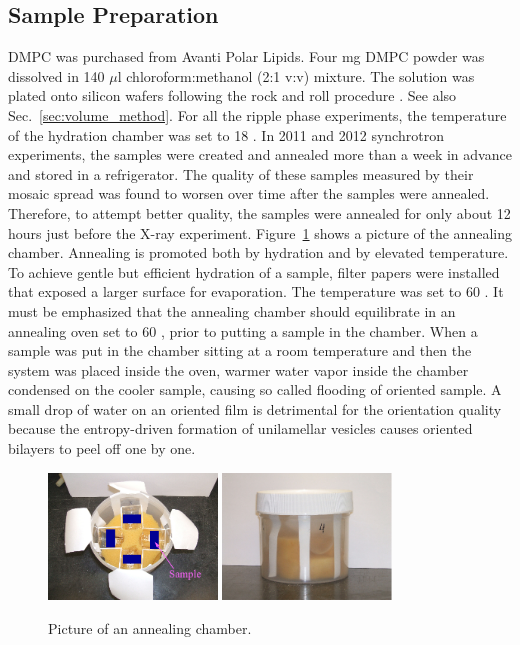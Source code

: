 \subsection{Sample Preparation}
DMPC was purchased from Avanti Polar Lipids.
Four mg DMPC powder was dissolved in 140 $\mu$l chloroform:methanol (2:1 v:v) 
mixture. The solution was plated onto silicon wafers following the rock and
roll procedure \cite{Tristram-Nagle07_MMB}. 
See also Sec.~\ref{sec:volume_method}.
For all the ripple phase experiments, the temperature of the hydration 
chamber was set to 18 \textcelsius. 
In 2011 and 2012 synchrotron experiments, the samples were created and annealed 
more than a week in advance and stored in a refrigerator. The quality of 
these samples measured by their mosaic spread was found to worsen over time
after the samples were annealed. Therefore, to attempt better quality, the 
samples were annealed for only about 12 hours just before the X-ray experiment.
Figure~\ref{fig:annealing_chamber} shows a picture of the annealing chamber.
Annealing is promoted both by hydration and by elevated temperature. 
To achieve gentle but efficient hydration of a sample, filter papers were installed
that exposed a larger surface for evaporation. The temperature was set to
60 \textcelsius.
It must be emphasized that the annealing 
chamber should equilibrate in an annealing oven set to 60 \textcelsius,
prior to putting a sample in the chamber.
When a sample was put in the chamber sitting at a room temperature and
then the system was placed inside the oven, warmer water vapor inside the chamber 
condensed on the cooler sample, causing so called flooding of oriented sample. 
A small drop of water on an oriented film is detrimental for the orientation quality because the
entropy-driven formation of unilamellar vesicles causes oriented bilayers to peel off
one by one. 

\begin{figure}[htbp]
  \centering
  \includegraphics[width=0.4\textwidth]{figures/ripple/MMs/annealing_chamber_topview}
  \quad
  \includegraphics[width=0.4\textwidth]{figures/ripple/MMs/annealing_chamber_sideview}  
  \caption[Pictures of an annealing chamber]{Picture of an annealing chamber.}
  \label{fig:annealing_chamber}
\end{figure}

